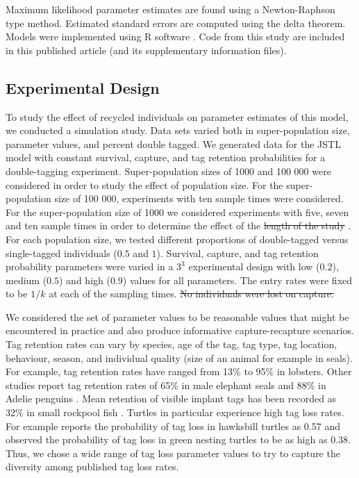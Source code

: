 \documentclass[12pt]{article}
\providecommand{\DIFaddtex}[1]{{\protect\color{blue}\uwave{#1}}} %
\providecommand{\DIFdeltex}[1]{{\protect\color{red}\sout{#1}}}                      %
\providecommand{\DIFaddbegin}{} %
\providecommand{\DIFaddend}{} %
\providecommand{\DIFdelbegin}{} %
\providecommand{\DIFdelend}{} %
\providecommand{\DIFadd}[1]{\texorpdfstring{\DIFaddtex{#1}}{#1}} %
\providecommand{\DIFdel}[1]{\texorpdfstring{\DIFdeltex{#1}}{}} %
\newcommand{\DIFscaledelfig}{0.5}
\newlength{\DIFdelgraphicswidth} %
\newlength{\DIFdelgraphicsheight} %
\newcommand{\DIFaddincludegraphics}[2][]{{\color{blue}\fbox{\DIFOincludegraphics[#1]{#2}}}} %
\newcommand{\DIFdelincludegraphics}[2][]{%
\sbox{\DIFdelgraphicsbox}{\DIFOincludegraphics[#1]{#2}}%
\settoboxwidth{\DIFdelgraphicswidth}{\DIFdelgraphicsbox} %
\settoboxtotalheight{\DIFdelgraphicsheight}{\DIFdelgraphicsbox} %
\scalebox{\DIFscaledelfig}{%
\parbox[b]{\DIFdelgraphicswidth}{\usebox{\DIFdelgraphicsbox}\\[-\baselineskip] \rule{\DIFdelgraphicswidth}{0em}}\llap{\resizebox{\DIFdelgraphicswidth}{\DIFdelgraphicsheight}{%
\setlength{\unitlength}{\DIFdelgraphicswidth}%
\begin{picture}(1,1)%
\thicklines\linethickness{2pt} %
{\color[rgb]{1,0,0}\put(0,0){\framebox(1,1){}}}%
{\color[rgb]{1,0,0}\put(0,0){\line( 1,1){1}}}%
{\color[rgb]{1,0,0}\put(0,1){\line(1,-1){1}}}%
\end{picture}%
}\hspace*{3pt}}} %
} %
\DeclareRobustCommand{\DIFaddbegin}{\DIFOaddbegin \let\includegraphics\DIFaddincludegraphics} %
\DeclareRobustCommand{\DIFaddend}{\DIFOaddend \let\includegraphics\DIFOincludegraphics} %
\DeclareRobustCommand{\DIFdelbegin}{\DIFOdelbegin \let\includegraphics\DIFdelincludegraphics} %
\DeclareRobustCommand{\DIFdelend}{\DIFOaddend \let\includegraphics\DIFOincludegraphics} %
\begin{document}
Maximum likelihood parameter estimates are found using a Newton-Raphson type method. Estimated standard errors are computed using the delta theorem. Models were implemented using R software \citep{R}. Code from this study are included in this published article (and its supplementary information files).


\subsection{Experimental Design}\label{experimental-design}

To study the effect of recycled individuals on parameter estimates of
this model, we conducted a simulation study. Data sets varied both in super-population size,
parameter values, and percent double tagged. We generated data for the
JSTL model with constant survival, capture, and tag retention
probabilities for a double-tagging experiment. Super-population sizes of
1000 and 100 000 were considered in order to study the effect of population size. For the super-population size
of 100 000, experiments with ten sample times were considered. For
the super-population size of 1000 we considered experiments with five,
seven and ten sample times in order to determine the effect of the \DIFdelbegin \DIFdel{length of
the study }\DIFdelend \DIFaddbegin \DIFadd{study length}\DIFaddend . For each population size, we
tested different proportions of double-tagged versus single-tagged
individuals (\(0.5\) and \(1\)). Survival, capture, and tag retention
probability parameters were varied in a \(3^3\) experimental design with
low (\(0.2\)), medium (\(0.5\)) and high (\(0.9\)) values for all
parameters. The entry rates were fixed to be $1/k$ at each of the
sampling times. 
\DIFdelbegin \DIFdel{No individuals were lost on capture.
}\DIFdelend 

We considered the set of parameter values to be reasonable values that might be encountered in practice and also produce informative capture-recapture scenarios.  Tag retention rates can vary by species, age of the tag, tag type, tag location, behaviour, season, and individual quality (size of an animal for example in seals).  For example, tag retention rates have ranged from 13\% \citep{Fogarty:1980} to 95\% \citep{Gonzalez:2012} in lobsters.  Other studies report tag retention rates of 65\% in male elephant seals \citep{Pistorius:2000} and 88\% in Adelie penguins \citep{Ainley:1980}.  Mean retention of visible implant tags has been recorded as 32\% in small rockpool fish \citep{Griffiths:2002}. Turtles in particular experience high tag loss rates.  For example \cite{Bellini:2001} reports the probability of tag loss in hawksbill turtles as 0.57 and    \cite{Bjorndal:1996} observed the probability of tag loss  in green nesting turtles to be as high as 0.38.   Thus, we chose a wide range of tag loss parameter values to try to capture the diversity among published tag loss rates.
\end{document}

